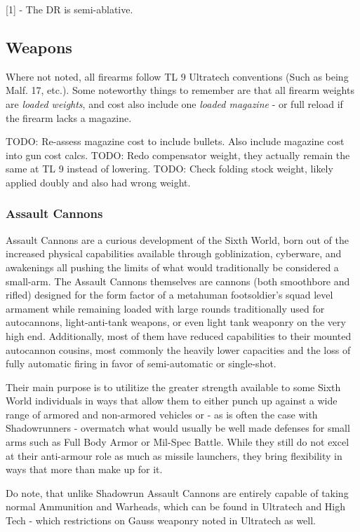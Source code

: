 [1] - The DR is semi-ablative.

\subsection{Weapons}

Where not noted, all firearms follow TL 9 Ultratech conventions (Such as being Malf. 17, etc.). Some noteworthy things to remember are that all firearm weights are \textit{loaded weights}, and cost also include one \textit{loaded magazine} - or full reload if the firearm lacks a magazine.

TODO: Re-assess magazine cost to include bullets. Also include magazine cost into gun cost calcs.
TODO: Redo compensator weight, they actually remain the same at TL 9 instead of lowering.
TODO: Check folding stock weight, likely applied doubly and also had wrong weight.

\subsubsection{Assault Cannons}

Assault Cannons are a curious development of the Sixth World, born out of the increased physical capabilities available through goblinization, cyberware, and awakenings all pushing the limits of what would traditionally be considered a small-arm. The Assault Cannons themselves are cannons (both smoothbore and rifled) designed for the form factor of a metahuman footsoldier's squad level armament while remaining loaded with large rounds traditionally used for autocannons, light-anti-tank weapons, or even light tank weaponry on the very high end. Additionally, most of them have reduced capabilities to their mounted autocannon cousins, most commonly the heavily lower capacities and the loss of fully automatic firing in favor of semi-automatic or single-shot.

Their main purpose is to utilitize the greater strength available to some Sixth World individuals in ways that allow them to either punch up against a wide range of armored and non-armored vehicles or - as is often the case with Shadowrunners - overmatch what would usually be well made defenses for small arms such as Full Body Armor or Mil-Spec Battle. While they still do not excel at their anti-armour role as much as missile launchers, they bring flexibility in ways that more than make up for it.

Do note, that unlike Shadowrun Assault Cannons are entirely capable of taking normal Ammunition and Warheads, which can be found in Ultratech and High Tech - which restrictions on Gauss weaponry noted in Ultratech as well.

